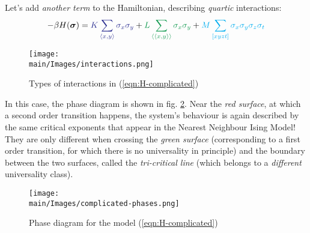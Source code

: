 \documentclass[../../main.tex]{subfiles}
\begin{document}
\medskip

Let's add \textit{another term} to the Hamiltonian, describing \textit{quartic} interactions:
\begin{align}\label{eqn:H-complicated}
    -\beta H(\bm{\sigma}) = \textcolor{Blue}{K \sum_{\langle x,y \rangle} \sigma_x \sigma_y} + \textcolor{ForestGreen}{L \sum_{\langle \langle x,y \rangle \rangle} \sigma_x \sigma_y} + \textcolor{Cyan}{M \sum_{[xyzt]} \sigma_x \sigma_y \sigma_z \sigma_t}
\end{align}
 
\begin{figure}[H]
    \centering
    \texttt{[image: \\main/Images/interactions.png]}
    \caption{Types of interactions in (\ref{eqn:H-complicated})}
    \label{fig:interactions}
\end{figure}

In this case, the phase diagram is shown in fig. \ref{fig:complicated-phases}. Near the \textit{red surface}, at which a second order transition happens, the system's behaviour is again described by the same critical exponents that appear in the Nearest Neighbour Ising Model! They are only different when crossing the \textit{green surface} (corresponding to a first order transition, for which there is no universality in principle) and the boundary between the two surfaces, called the \textit{tri-critical line} (which belongs to a \textit{different} universality class).   


\begin{figure}[H]
    \centering
    \texttt{[image: \\main/Images/complicated-phases.png]}
    \caption{Phase diagram for the model (\ref{eqn:H-complicated})}
    \label{fig:complicated-phases}
\end{figure}

 
\end{document}
